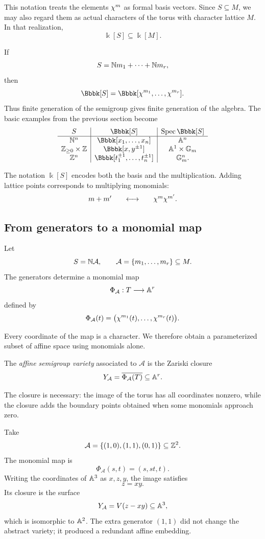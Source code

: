 This notation treats the elements \(\chi^{m}\) as formal basis
vectors. Since \(S\subseteq M\), we may also regard them as actual
characters of the torus with character lattice \(M\). In that
realization,
\[
\Bbbk[S]\subseteq\Bbbk[M].
\]

If
\[
S=\mathbb{N} m_1+\cdots+\mathbb{N} m_r,
\]
then
\[
\Bbbk[S]
=
\Bbbk[
\character{m_1},\ldots,\character{m_r}
].
\]
Thus finite generation of the semigroup gives finite generation of
the algebra. The basic examples from the previous section become
\[
\begin{array}{c|c|c}
S&\Bbbk[S]&\Spec\Bbbk[S]\\
\hline
\NN^n&\Bbbk[x_1,\ldots,x_n]&\AAA^n\\
\ZZ_{\geq0}\times\ZZ&\Bbbk[x,y^{\pm1}]&\AAA^1\times\Gm\\
\ZZ^n&\Bbbk[t_1^{\pm1},\ldots,t_n^{\pm1}]&\Gm^n.
\end{array}
\]

The notation \(\Bbbk[S]\) encodes both the basis and the
multiplication. Adding lattice points corresponds to multiplying
monomials:
\[
\begin{array}{c@{\qquad\longleftrightarrow\qquad}c}
m+m'
&
\character{m}\character{m'}.
\end{array}
\]

\subsection{From generators to a monomial map}

Let
\[
S=\mathbb{N}\mathcal A,
\qquad
\mathcal A=\{m_1,\ldots,m_r\}\subseteq M.
\]
The generators determine a monomial map
\[
\Phi_{\mathcal A}:T\longrightarrow\mathbb{A}^r
\]
defined by
\[
\Phi_{\mathcal A}(t)
=
\bigl(
\chi^{m_1}(t),\ldots,\chi^{m_r}(t)
\bigr).
\]

Every coordinate of the map is a character. We therefore obtain a
parameterized subset of affine space using monomials alone.

\begin{definition}
The \emph{affine semigroup variety} associated to
\(\mathcal A\) is the Zariski closure
\[
Y_{\mathcal A}
=
\overline{\Phi_{\mathcal A}(T)}
\subseteq\mathbb{A}^r.
\]
\end{definition}

The closure is necessary: the image of the torus has all coordinates
nonzero, while the closure adds the boundary points obtained when
some monomials approach zero.

\begin{example}
Take
\[
\mathcal A=\{(1,0),(1,1),(0,1)\}\subseteq\mathbb{Z}^2.
\]
The monomial map is
\[
\Phi_{\mathcal A}(s,t)
=
(s,st,t).
\]
Writing the coordinates of \(\mathbb{A}^3\) as \(x,z,y\), the image satisfies
\[
z=xy.
\]
Its closure is the surface
\[
Y_{\mathcal A}
=
V(z-xy)\subseteq\mathbb{A}^3,
\]
which is isomorphic to \(\mathbb{A}^2\). The extra generator \((1,1)\) did
not change the abstract variety; it produced a redundant affine
embedding.
\end{example}

